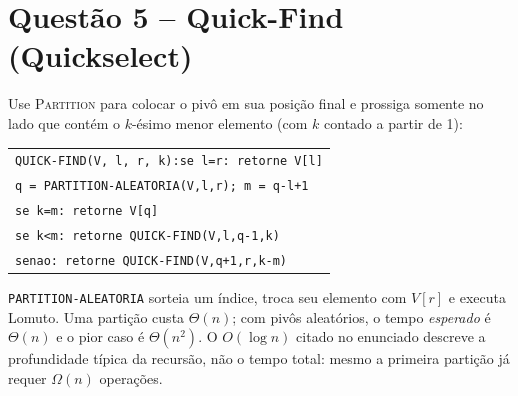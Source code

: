 \documentclass[10pt,a4paper]{article}
\newcommand{\questao}[1]{\section*{\color{azul}Questão #1}}
\begin{document}
\questao{5 -- Quick-Find (Quickselect)}
Use \textsc{Partition} para colocar o pivô em sua posição final e prossiga somente no lado que contém o $k$-ésimo menor elemento (com $k$ contado a partir de 1):
\begin{center}
\begin{tabular}{@{}l@{}}
\texttt{QUICK-FIND(V, l, r, k):}\quad\texttt{se l=r: retorne V[l]}\\
\quad\texttt{q = PARTITION-ALEATORIA(V,l,r); m = q-l+1}\\
\quad\texttt{se k=m: retorne V[q]}\\
\quad\texttt{se k<m: retorne QUICK-FIND(V,l,q-1,k)}\\
\quad\texttt{senao: retorne QUICK-FIND(V,q+1,r,k-m)}
\end{tabular}
\end{center}
\texttt{PARTITION-ALEATORIA} sorteia um índice, troca seu elemento com $V[r]$ e executa Lomuto. Uma partição custa $\Theta(n)$; com pivôs aleatórios, o tempo \emph{esperado} é $\Theta(n)$ e o pior caso é $\Theta(n^2)$. O $O(\log n)$ citado no enunciado descreve a profundidade típica da recursão, não o tempo total: mesmo a primeira partição já requer $\Omega(n)$ operações.
\end{document}

